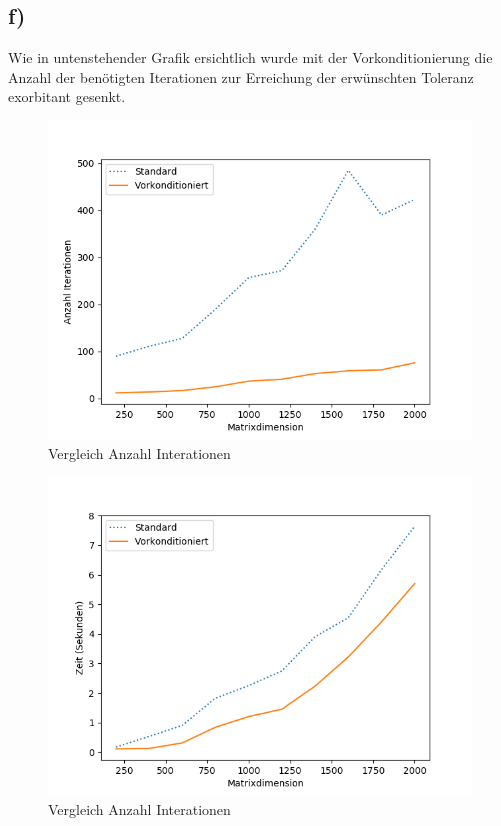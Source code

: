 \subsection*{f)}
Wie in untenstehender Grafik ersichtlich wurde mit der Vorkonditionierung die Anzahl der benötigten Iterationen
zur Erreichung der erwünschten Toleranz exorbitant gesenkt.
\begin{figure}
    \centering
    \includegraphics[width=\linewidth]{Aufgabe_1/f.png}
    \caption{Vergleich Anzahl Interationen}
    \label{fig:my_label}
\end{figure}
\begin{figure}
    \centering
    \includegraphics[width=\linewidth]{Aufgabe_1/vcg.png}
    \caption{Vergleich Anzahl Interationen}
    \label{fig:my_label}
\end{figure}
